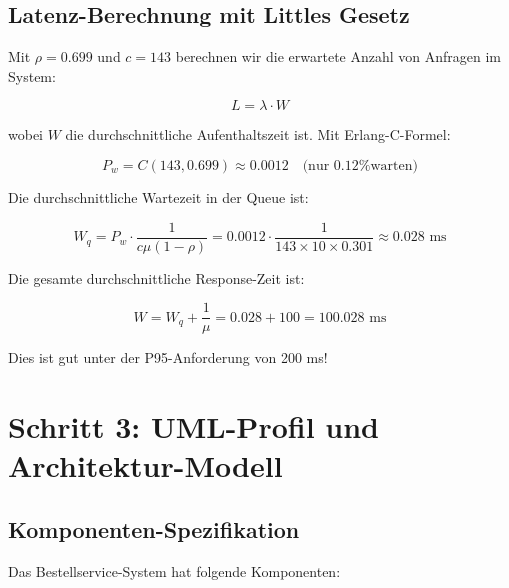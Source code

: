 \documentclass[a4paper,11pt]{article}
\theoremstyle{definition}
\begin{document}
\subsection{Latenz-Berechnung mit Littles Gesetz}

Mit $\rho = 0.699$ und $c = 143$ berechnen wir die erwartete Anzahl von Anfragen im System:

\[
L = \lambda \cdot W
\]

wobei $W$ die durchschnittliche Aufenthaltszeit ist. Mit Erlang-C-Formel:

\[
P_w = C(143, 0.699) \approx 0.0012 \quad \text{(nur 0.12\% warten)}
\]

Die durchschnittliche Wartezeit in der Queue ist:

\[
W_q = P_w \cdot \frac{1}{c \mu (1 - \rho)} = 0.0012 \cdot \frac{1}{143 \times 10 \times 0.301} \approx 0.028 \text{ ms}
\]

Die gesamte durchschnittliche Response-Zeit ist:

\[
W = W_q + \frac{1}{\mu} = 0.028 + 100 = 100.028 \text{ ms}
\]

Dies ist gut unter der P95-Anforderung von 200 ms!

\section{Schritt 3: UML-Profil und Architektur-Modell}

\subsection{Komponenten-Spezifikation}

Das Bestellservice-System hat folgende Komponenten:
\end{document}
